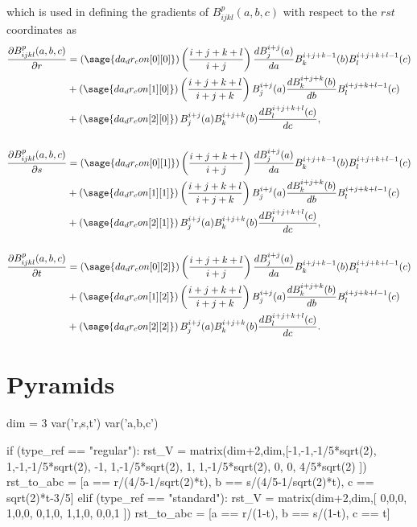\documentclass{article}
\numberwithin{equation}{section}
\begin{document}
which is used in defining the gradients of $B^p_{ijkl}(a,b,c)$ with respect to the $rst$ coordinates as
\begin{align*}
\frac{\partial B^p_{ijkl}(a,b,c)}{\partial r}
& = \left(\sage{da_dr_con[0][0]}\right)\left(\frac{i+j+k+l}{i+j}\right) \frac{d B^{i+j}_j(a)}{da} B^{i+j+k-1}_k(b) B^{i+j+k+l-1}_l(c) \\
& + \left(\sage{da_dr_con[1][0]}\right)\left(\frac{i+j+k+l}{i+j+k}\right) B^{i+j}_j(a) \frac{d B^{i+j+k}_k(b)}{db} B^{i+j+k+l-1}_l(c) \\
& + \left(\sage{da_dr_con[2][0]}\right) B^{i+j}_j(a) B^{i+j+k}_k(b) \frac{d B^{i+j+k+l}_l(c)}{dc}, \\
\\
\frac{\partial B^p_{ijkl}(a,b,c)}{\partial s}
& = \left(\sage{da_dr_con[0][1]}\right)\left(\frac{i+j+k+l}{i+j}\right) \frac{d B^{i+j}_j(a)}{da} B^{i+j+k-1}_k(b) B^{i+j+k+l-1}_l(c) \\
& + \left(\sage{da_dr_con[1][1]}\right)\left(\frac{i+j+k+l}{i+j+k}\right) B^{i+j}_j(a) \frac{d B^{i+j+k}_k(b)}{db} B^{i+j+k+l-1}_l(c) \\
& + \left(\sage{da_dr_con[2][1]}\right) B^{i+j}_j(a) B^{i+j+k}_k(b) \frac{d B^{i+j+k+l}_l(c)}{dc}, \\
\\
\frac{\partial B^p_{ijkl}(a,b,c)}{\partial t}
& = \left(\sage{da_dr_con[0][2]}\right)\left(\frac{i+j+k+l}{i+j}\right) \frac{d B^{i+j}_j(a)}{da} B^{i+j+k-1}_k(b) B^{i+j+k+l-1}_l(c) \\
& + \left(\sage{da_dr_con[1][2]}\right)\left(\frac{i+j+k+l}{i+j+k}\right) B^{i+j}_j(a) \frac{d B^{i+j+k}_k(b)}{db} B^{i+j+k+l-1}_l(c) \\
& + \left(\sage{da_dr_con[2][2]}\right) B^{i+j}_j(a) B^{i+j+k}_k(b) \frac{d B^{i+j+k+l}_l(c)}{dc}.
\end{align*}

\section{Pyramids}


\begin{sagesilent}
dim = 3
var('r,s,t')
var('a,b,c')
\end{sagesilent}

\begin{sagesilent}
if (type_ref == "regular"):
    rst_V = matrix(dim+2,dim,[-1,-1,-1/5*sqrt(2),
                               1,-1,-1/5*sqrt(2),
                              -1, 1,-1/5*sqrt(2),
                               1, 1,-1/5*sqrt(2),
                               0, 0, 4/5*sqrt(2) ])
    rst_to_abc = [a == r/(4/5-1/sqrt(2)*t), b == s/(4/5-1/sqrt(2)*t), c == sqrt(2)*t-3/5]
elif (type_ref == "standard"):
    rst_V = matrix(dim+2,dim,[ 0,0,0,
                               1,0,0,
                               0,1,0,
                               1,1,0,
                               0,0,1 ])
    rst_to_abc = [a == r/(1-t), b == s/(1-t), c == t]
\end{sagesilent}
\end{document}
